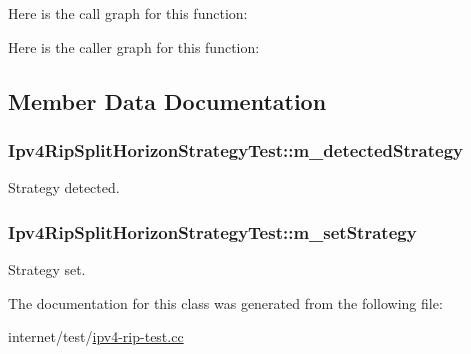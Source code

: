Here is the call graph for this function\+:




Here is the caller graph for this function\+:




\subsection{Member Data Documentation}
\subsubsection[{\texorpdfstring{m\+\_\+detected\+Strategy}{m_detectedStrategy}}]{ Ipv4\+Rip\+Split\+Horizon\+Strategy\+Test\+::m\+\_\+detected\+Strategy\hspace{0.3cm}{\ttfamily [private]}}\hypertarget{classIpv4RipSplitHorizonStrategyTest_a5d6aa772524fbfc3865b823a5076a502}{}\label{classIpv4RipSplitHorizonStrategyTest_a5d6aa772524fbfc3865b823a5076a502}


Strategy detected. 

\subsubsection[{\texorpdfstring{m\+\_\+set\+Strategy}{m_setStrategy}}]{ Ipv4\+Rip\+Split\+Horizon\+Strategy\+Test\+::m\+\_\+set\+Strategy\hspace{0.3cm}{\ttfamily [private]}}\hypertarget{classIpv4RipSplitHorizonStrategyTest_aca5223c1caeaa4074b4458ae3ec8e81c}{}\label{classIpv4RipSplitHorizonStrategyTest_aca5223c1caeaa4074b4458ae3ec8e81c}


Strategy set. 



The documentation for this class was generated from the following file\+:\begin{DoxyCompactItemize}
\item 
internet/test/\hyperlink{ipv4-rip-test_8cc}{ipv4-\/rip-\/test.\+cc}\end{DoxyCompactItemize}
